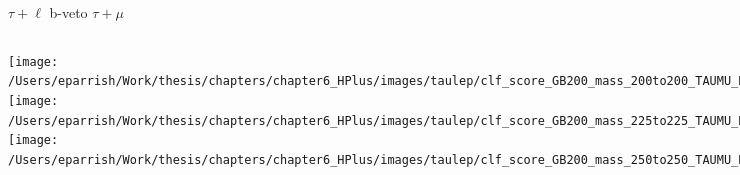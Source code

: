 \documentclass[aspectratio=169,xcolor=table]{beamer}
\begin{document}
    \begin{frame}[t]{$\tau+\ell$ b-veto $\tau+\mu$}
      \begin{columns}[t]
          \texttt{[image: /Users/eparrish/Work/thesis/chapters/chapter6\_HPlus/images/taulep/clf\_score\_GB200\_mass\_200to200\_TAUMU\_BVETO.png]}
          \texttt{[image: /Users/eparrish/Work/thesis/chapters/chapter6\_HPlus/images/taulep/clf\_score\_GB200\_mass\_225to225\_TAUMU\_BVETO.png]}
          \texttt{[image: /Users/eparrish/Work/thesis/chapters/chapter6\_HPlus/images/taulep/clf\_score\_GB200\_mass\_250to250\_TAUMU\_BVETO.png]}

          \texttt{[image: /Users/eparrish/Work/thesis/chapters/chapter6\_HPlus/images/taulep/clf\_score\_GB200\_mass\_275to275\_TAUMU\_BVETO.png]}
          \texttt{[image: /Users/eparrish/Work/thesis/chapters/chapter6\_HPlus/images/taulep/clf\_score\_GB200\_mass\_300to300\_TAUMU\_BVETO.png]}
          \texttt{[image: /Users/eparrish/Work/thesis/chapters/chapter6\_HPlus/images/taulep/clf\_score\_GB200\_mass\_350to350\_TAUMU\_BVETO.png]}

          \texttt{[image: /Users/eparrish/Work/thesis/chapters/chapter6\_HPlus/images/taulep/clf\_score\_GB200\_mass\_400to400\_TAUMU\_BVETO.png]}
          \texttt{[image: /Users/eparrish/Work/thesis/chapters/chapter6\_HPlus/images/taulep/clf\_score\_GB200\_mass\_500to500\_TAUMU\_BVETO.png]}
          \texttt{[image: /Users/eparrish/Work/thesis/chapters/chapter6\_HPlus/images/taulep/clf\_score\_GB200\_mass\_600to600\_TAUMU\_BVETO.png]}

          \texttt{[image: /Users/eparrish/Work/thesis/chapters/chapter6\_HPlus/images/taulep/clf\_score\_GB200\_mass\_700to700\_TAUMU\_BVETO.png]}
          \texttt{[image: /Users/eparrish/Work/thesis/chapters/chapter6\_HPlus/images/taulep/clf\_score\_GB200\_mass\_800to800\_TAUMU\_BVETO.png]}
          \texttt{[image: /Users/eparrish/Work/thesis/chapters/chapter6\_HPlus/images/taulep/clf\_score\_GB200\_mass\_900to900\_TAUMU\_BVETO.png]}

      \end{columns}
    \end{frame}
\end{document}
